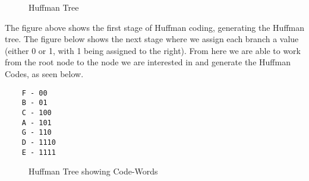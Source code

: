 \begin{figure}[H]
    \centering
    
    \caption{Huffman Tree}
\end{figure}
The figure above shows the first stage of Huffman coding, generating the Huffman tree. The figure below shows the next stage where we assign each branch a value (either 0 or 1, with 1 being assigned to the right). From here we are able to work from the root node to the node we are interested in and generate the Huffman Codes, as seen below.
\begin{verbatim}
    F - 00
    B - 01
    C - 100
    A - 101
    G - 110
    D - 1110
    E - 1111
\end{verbatim}

\begin{figure}[H]
    \centering
    
    \caption{Huffman Tree showing Code-Words}
    
\end{figure}